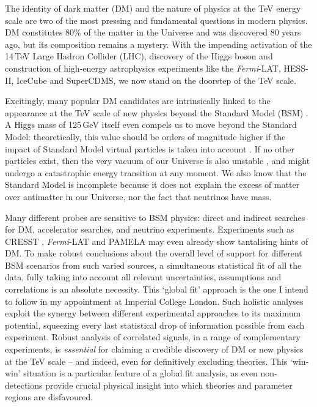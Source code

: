 \documentclass[a4paper,11pt]{article}
\begin{document}
The identity of dark matter (DM) and the nature of physics at the TeV energy scale are two of the most pressing and fundamental questions in modern physics.  DM constitutes 80\% of the matter in the Universe and was discovered 80 years ago, but its composition remains a mystery.  With the impending activation of the 14\,TeV Large Hadron Collider (LHC), discovery of the Higgs boson and construction of high-energy astrophysics experiments like the \textit{Fermi}-LAT, HESS-II, IceCube and SuperCDMS, we now stand on the doorstep of the TeV scale.  

Excitingly, many popular DM candidates are intrinsically linked to the appearance at the TeV scale of new physics beyond the Standard Model (BSM) \cite{Jungman96,Bergstrom00,Bertone05}.  A Higgs mass of 125\,GeV itself even compels us to move beyond the Standard Model: theoretically, this value should be orders of magnitude higher if the impact of Standard Model virtual particles is taken into account \cite{Martin,BaerTata}.  If no other particles exist, then the very vacuum of our Universe is also unstable \cite{Degrassi12}, and might undergo a catastrophic energy transition at any moment.  We also know that the Standard Model is incomplete because it does not explain the excess of matter over antimatter in our Universe, nor the fact that neutrinos have mass.

Many different probes are sensitive to BSM physics: direct and indirect searches for DM, accelerator searches, and neutrino experiments.  Experiments such as CRESST \cite{CRESST11}, \textit{Fermi}-LAT \cite{Hooper11,Bringmann12,Weniger130GeV} and PAMELA \cite{Pamelapositron} may even already show tantalising hints of DM.  To make robust conclusions about the overall level of support for different BSM scenarios from such varied sources, a simultaneous statistical fit of all the data, fully taking into account all relevant uncertainties, assumptions and correlations is an absolute necessity.  This `global fit' approach is the one I intend to follow in my appointment at Imperial College London.  Such holistic analyses exploit the synergy between different experimental approaches to its maximum potential, squeezing every last statistical drop of information possible from each experiment.  Robust analysis of correlated signals, in a range of complementary experiments, is \textit{essential} for claiming a credible discovery of DM or new physics at the TeV scale -- and indeed, even for definitively excluding theories.  This `win-win' situation is a particular feature of a global fit analysis, as even non-detections provide crucial physical insight into which theories and parameter regions are disfavoured.
\end{document}
